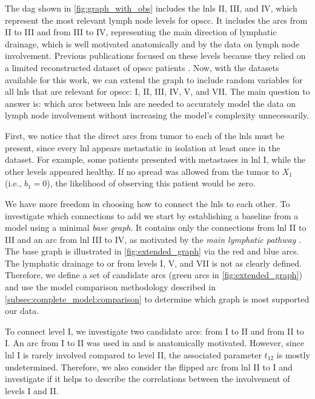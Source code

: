 \documentclass[twocolumn]{aastex631}
\begin{document}
The \gls{dag} shown in \autoref{fig:graph_with_obs} includes the \glspl{lnl} II, III, and IV, which represent the most relevant lymph node levels for \gls{opscc}. It includes the arcs from II to III and from III to IV, representing the main direction of lymphatic drainage, which is well motivated anatomically and by the data on lymph node involvement. Previous publications  \citep{pouymayou_bayesian_2019,ludwig_hidden_2021} focused on these levels because they relied on a limited reconstructed dataset of \gls{opscc} patients \citep{sanguineti_defining_2009}. Now, with the datasets available for this work, we can extend the graph to include random variables for all \glspl{lnl} that are relevant for \gls{opscc}: I, II, III, IV, V, and VII. The main question to answer is: which arcs between \glspl{lnl} are needed to accurately model the data on lymph node involvement without increasing the model's complexity unnecessarily.

First, we notice that the direct arcs from tumor to each of the \glspl{lnl} must be present, since every \gls{lnl} appears metastatic in isolation at least once in the dataset. For example, some patients presented with metastases in \gls{lnl} I, while the other levels appeared healthy. If no spread was allowed from the tumor to $X_1$ (i.e., $b_1 = 0$), the likelihood of observing this patient would be zero.

We have more freedom in choosing how to connect the \glspl{lnl} to each other. To investigate which connections to add we start by establishing a baseline from a model using a minimal \emph{base graph}. It contains only the connections from \gls{lnl} II to III and an arc from \gls{lnl} III to IV, as motivated by the \emph{main lymphatic pathway} \citep{lengele_anatomical_2007}. The base graph is illustrated in \autoref{fig:extended_graph} via the red and blue arcs. The lymphatic drainage to or from levels I, V, and VII is not as clearly defined. Therefore, we define a set of candidate arcs (green arcs in \autoref{fig:extended_graph}) and use the model comparison methodology described in \autoref{subsec:complete_model:comparison} to determine which graph is most supported our data. 

To connect level I, we investigate two candidate arcs: from I to II and from II to I. An arc from I to II was used in \citep{pouymayou_bayesian_2019,ludwig_hidden_2021} and is anatomically motivated. However, since \gls{lnl} I is rarely involved compared to level II, the associated parameter $t_{12}$ is mostly undetermined. Therefore, we also consider the flipped arc from \gls{lnl} II to I and investigate if it helps to describe the correlations between the involvement of levels I and II.
\end{document}
